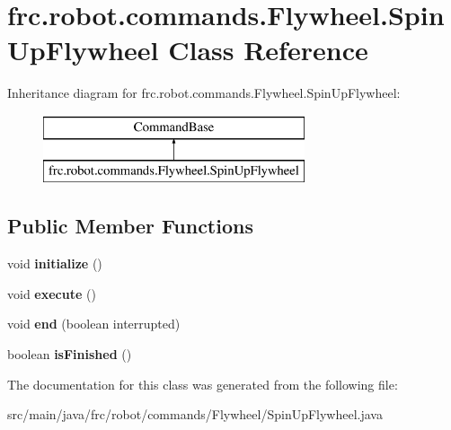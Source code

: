 \hypertarget{classfrc_1_1robot_1_1commands_1_1_flywheel_1_1_spin_up_flywheel}{}\section{frc.\+robot.\+commands.\+Flywheel.\+Spin\+Up\+Flywheel Class Reference}
\label{classfrc_1_1robot_1_1commands_1_1_flywheel_1_1_spin_up_flywheel}
Inheritance diagram for frc.\+robot.\+commands.\+Flywheel.\+Spin\+Up\+Flywheel\+:\begin{figure}[H]
\begin{center}
\leavevmode
\includegraphics[height=2.000000cm]{classfrc_1_1robot_1_1commands_1_1_flywheel_1_1_spin_up_flywheel}
\end{center}
\end{figure}
\subsection*{Public Member Functions}
\begin{DoxyCompactItemize}
\item 
\mbox{\label{classfrc_1_1robot_1_1commands_1_1_flywheel_1_1_spin_up_flywheel_a354045866afbccaf791f23c1f5a221f4}} 
void {\bfseries initialize} ()
\item 
\mbox{\label{classfrc_1_1robot_1_1commands_1_1_flywheel_1_1_spin_up_flywheel_aaff3f7d4c67bdbbb800ee5d05bcfebfe}} 
void {\bfseries execute} ()
\item 
\mbox{\label{classfrc_1_1robot_1_1commands_1_1_flywheel_1_1_spin_up_flywheel_a2e634bcac319d2b866121cf2d82d2113}} 
void {\bfseries end} (boolean interrupted)
\item 
\mbox{\label{classfrc_1_1robot_1_1commands_1_1_flywheel_1_1_spin_up_flywheel_a09cdb3d003ccbcd5194e39f889116be7}} 
boolean {\bfseries is\+Finished} ()
\end{DoxyCompactItemize}


The documentation for this class was generated from the following file\+:\begin{DoxyCompactItemize}
\item 
src/main/java/frc/robot/commands/\+Flywheel/Spin\+Up\+Flywheel.\+java\end{DoxyCompactItemize}
